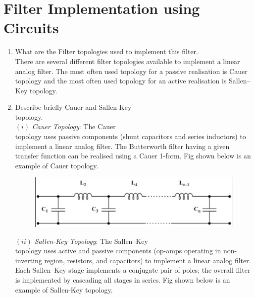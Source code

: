 \documentclass[journal,12pt,twocolumn]{IEEEtran}
\renewcommand\thesection{\arabic{section}}
\begin{document}
\section{Filter Implementation using Circuits}
\begin{enumerate}[label=\thesection.\arabic*,ref=\thesection.\theenumi]
\item What are the Filter topologies used to implement this filter.\\
\solution There are several different filter topologies available to implement a linear analog filter. The most often used topology for a passive realisation is Cauer topology and the most often used topology for an active realisation is Sallen–Key topology.\\
\item Describe briefly Cauer and Sallen-Key \\ topology. \\
 \solution $(i)$ \textit{{Cauer Topology}}: The Cauer \\ topology uses passive components (shunt capacitors and series inductors) to implement a linear analog filter. The Butterworth filter having a given transfer function can be realised using a Cauer 1-form. Fig shown below is an example of Cauer topology. \\
 \begin{figure}[!ht]
\centering
\includegraphics[width=0.7\columnwidth]{./figs/Cauer.eps}
\caption{}
\label{fig:1}
\end{figure}
 $(ii)$ \textit{Sallen-Key Topology}: The Sallen–Key \\ topology uses active and passive components (op-amps operating in non-inverting region, resistors, and capacitors) to implement a linear analog filter. Each Sallen–Key stage implements a conjugate pair of poles; the overall filter is implemented by cascading all stages in series. Fig shown below is an example of Sallen-Key topology.\\

\end{enumerate}
\end{document}
